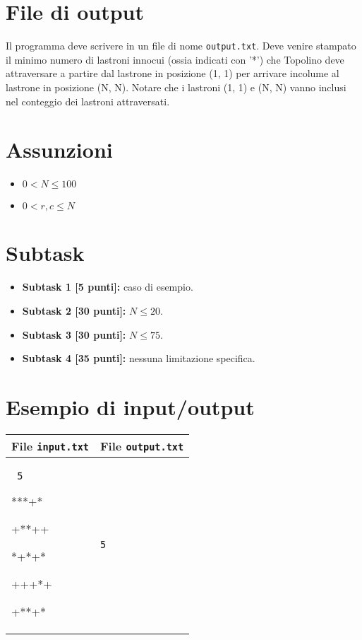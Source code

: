 \documentclass[a4paper,11pt]{article}
\newcommand{\file}[1]{\texttt{#1}}
\newcommand{\esempio}[2]{
\noindent\begin{minipage}{\textwidth}
\begin{tabular}{|p{11cm}|p{5cm}|}
	\hline
	\textbf{File \file{input.txt}} & \textbf{File \file{output.txt}}\\
	\hline
	\tt \small #1 &
	\tt \small #2 \\
	\hline
\end{tabular}
\end{minipage}
}
\begin{document}
\section*{File di output}
Il programma deve scrivere in un file di nome \file{output.txt}. Deve venire stampato il minimo numero di lastroni innocui (ossia indicati con '*') che Topolino deve attraversare a partire dal
lastrone in posizione (1, 1) per arrivare incolume al lastrone in posizione (N, N). Notare che i
lastroni (1, 1) e (N, N) vanno inclusi nel conteggio dei lastroni attraversati.

\section*{Assunzioni}
\begin{itemize}
\item $0 < N \le 100$
\item $0 < r,c \le N$
\end{itemize}

\section*{Subtask}
\begin{itemize}
\item \textbf{Subtask 1 [\phantom{1}5 punti]:} caso di esempio.
\item \textbf{Subtask 2 [30 punti]:} $N \le 20$.
\item \textbf{Subtask 3 [30 punti]:} $N \le 75$.
\item \textbf{Subtask 4 [35 punti]:} nessuna limitazione specifica.
\end{itemize}


\section*{Esempio di input/output}
\esempio{
5

***+*

+**++

*+*+*

+++*+

+**+*
}{5}
\end{document}
